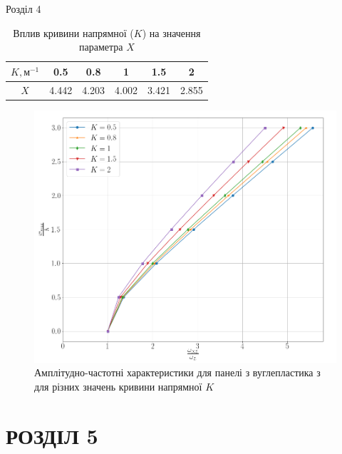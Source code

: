 \documentclass[handout, 8pt]{beamer}
\numberwithin{figure}{section}
\numberwithin{equation}{section}
\numberwithin{table}{section}
\begin{document}
\begin{frame}{Розділ 4}
\begin{table}[h!]
\caption{Вплив кривини напрямної ($K$) на значення параметра $X$}
\centering
 \begin{tabular}{| c | c | c | c | c | c |} 
 \hline
 $K, м^{-1}$ & 0.5 & 0.8 & 1 & 1.5 & 2 \\ 
  \hline
 $X$ & 4.442 & 4.203 & 4.002 & 3.421 & 2.855 \\
   \hline
\end{tabular}
\end{table}

\begin{figure}
	\includegraphics[scale=0.2]{pic/AFR_curvature.png}
		\caption{Амплітудно-частотні характеристики для панелі з вуглепластика з для різних значень кривини напрямної $K$}
		\label{fig:AFR_layers}
\end{figure}

\end{frame}

\section{РОЗДІЛ 5}
\end{document}

